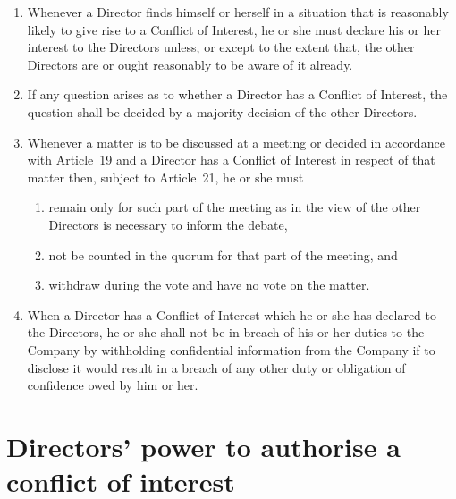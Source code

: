 \documentclass[a4paper,12pt]{article}
\begin{document}
\begin{enumerate}
  \item Whenever a Director finds himself or herself in a situation that is reasonably likely to give rise to a Conflict of Interest, he or she must declare his or her interest to the Directors unless, or except to the extent that, the other Directors are or ought reasonably to be aware of it already.
  \item If any question arises as to whether a Director has a Conflict of Interest, the question shall be decided by a majority decision of the other Directors.
  \item Whenever a matter is to be discussed at a meeting or decided in accordance with Article 19 and a Director has a Conflict of Interest in respect of that matter then, subject to Article 21, he or she must
  \begin{enumerate}
    \item remain only for such part of the meeting as in the view of the other Directors is necessary to inform the debate,
    \item not be counted in the quorum for that part of the meeting, and
    \item withdraw during the vote and have no vote on the matter.
  \end{enumerate}
  \item	When a Director has a Conflict of Interest which he or she has declared to the Directors, he or she shall not be in breach of his or her duties to the Company by withholding confidential information from the Company if to disclose it would result in a breach of any other duty or obligation of confidence owed by him or her.
\end{enumerate}

\section{Directors' power to authorise a conflict of interest}
\end{document}
